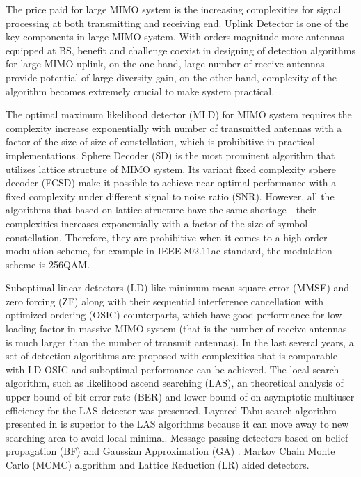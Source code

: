 \documentclass[12pt, draftclsnofoot, onecolumn]{IEEEtran}
\begin{document}
\begin{spacing}{2}
  The price paid for large MIMO system is the increasing complexities for signal processing at both transmitting and receiving end. Uplink Detector is one of the key components in large MIMO system. With orders magnitude more antennas equipped at BS, benefit and challenge coexist in designing of detection algorithms for large MIMO uplink, on the one hand, large number of receive antennas provide potential of large diversity gain, on the other hand, complexity of the algorithm becomes extremely crucial to make system practical. 
  
The optimal maximum likelihood detector (MLD) for MIMO system requires the complexity increase exponentially with number of transmitted antennas with a factor of the size of size of constellation, which is prohibitive in practical implementations. 
Sphere Decoder (SD)\cite{damen2003maximum} is the most prominent algorithm that utilizes lattice structure of MIMO system. 
Its variant fixed complexity sphere decoder (FCSD)\cite{barbero2008fixing} make it possible to achieve near optimal performance with a fixed complexity under different signal to noise ratio (SNR). However, all the algorithms that based on lattice structure have the same shortage - their complexities increases exponentially with a factor of the size of symbol constellation. Therefore, they are prohibitive when it comes to a high order modulation scheme, for example in IEEE 802.11ac standard\cite{IEEE802.11ac}, the modulation scheme is 256QAM. 
 
Suboptimal linear detectors (LD) like minimum mean square error (MMSE) and zero forcing (ZF) along with their sequential interference cancellation with optimized ordering (OSIC) counterparts\cite{wolniansky1998v}\cite{foschini1999simplified}\cite{benesty2003fast}, which have good performance for low loading factor in massive MIMO system (that is the number of receive antennas is much larger than the number of transmit antennas)\cite{hoydis2013massive}. In the last several years, a set of detection algorithms are proposed with complexities that is comparable with LD-OSIC and suboptimal performance can be achieved.  The local search algorithm, such as likelihood ascend searching (LAS)\cite{vardhan2008low}\cite{li2010multiple}, an theoretical analysis of upper bound of bit error rate (BER) and lower bound of on asymptotic multiuser efficiency for the LAS detector was presented\cite{sunfamily}. Layered Tabu search algorithm presented in\cite{srinidhi2011layered} is superior to the LAS algorithms because it can move away to new searching area to avoid local minimal. Message passing detectors based on belief propagation (BF) and Gaussian Approximation (GA) \cite{goldberger2011mimo}\cite{som2011low}\cite{narasimhan2014channel}\cite{som2010improved}. Markov Chain Monte Carlo (MCMC) algorithm\cite{datta2013novel}  and Lattice Reduction (LR) aided detectors\cite{zhou2013element}.


\end{spacing}
\end{document}
